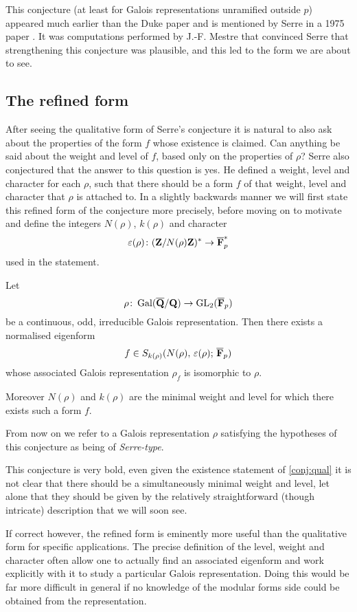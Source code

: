 \documentclass[a4paper,12pt]{article}
\begin{document}
This conjecture (at least for Galois representations unramified outside $p$) appeared much earlier than the Duke paper and is mentioned by Serre in a 1975 paper \cite[sec. 3]{Serre75}.
It was computations performed by J.-F. Mestre that convinced Serre that strengthening this conjecture was plausible, and this led to the form we are about to see.



\subsection{The refined form}
After seeing the qualitative form of Serre's conjecture it is natural to also ask about the properties of the form $f$ whose existence is claimed.
Can anything be said about the weight and level of $f$, based only on the properties of $\rho$?
Serre also conjectured that the answer to this question is yes.
He defined a weight, level and character for each $\rho$, such that there should be a form $f$ of that weight, level and character that $\rho$ is attached to.
In a slightly backwards manner we will first state this refined form of the conjecture more precisely, before moving on to motivate and define the integers $N(\rho)$, $k(\rho)$ and character
\[
\varepsilon(\rho)\colon (\mathbf{Z}/N(\rho)\mathbf{Z})^* \to \overline{\mathbf{F}}_p^*
\]
used in the statement.

\begin{conjecture}\label{conj:ref}
Let
\[
\rho\colon \operatorname{Gal}(\overline{\mathbf{Q}}/\mathbf{Q}) \to \operatorname{GL}_2(\overline{\mathbf{F}}_p)
\]
be a continuous, odd, irreducible Galois representation.
Then there exists a normalised eigenform
\[
f\in S_{k(\rho)}(N(\rho),\,\varepsilon(\rho);\,\overline{\mathbf{F}}_p)
\]
whose associated Galois representation $\rho_f$ is isomorphic to $\rho$.

Moreover $N(\rho)$ and $k(\rho)$ are the minimal weight and level for which there exists such a form $f$.
\end{conjecture}

From now on we refer to a Galois representation $\rho$ satisfying the hypotheses of this conjecture as being of \emph{Serre-type}.

This conjecture is very bold, even given the existence statement of \cref{conj:qual} it is not clear that there should be a simultaneously minimal weight and level, let alone that they should be given by the relatively straightforward (though intricate) description that we will soon see.

If correct however, the refined form is eminently more useful than the qualitative form for specific applications.
The precise definition of the level, weight and character often allow one to actually find an associated eigenform and work explicitly with it to study a particular Galois representation.
Doing this would be far more difficult in general if no knowledge of the modular forms side could be obtained from the representation.
\end{document}
